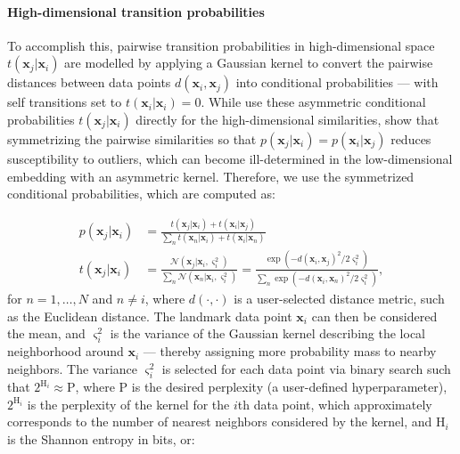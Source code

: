 \documentclass[11pt,a4paper,oneside]{book}
\begin{document}
\begin{appendices}
\paragraph{High-dimensional transition probabilities} To accomplish this, pairwise transition probabilities in high-dimensional space $t(\mathbf{x}_j | \mathbf{x}_i)$ are modelled by applying a Gaussian kernel to convert the pairwise distances between data points $d(\mathbf{x}_i, \mathbf{x}_j)$ into conditional probabilities --- with self transitions set to $t(\mathbf{x}_i | \mathbf{x}_i) = 0$. While \cite{ding2018scvis} use these asymmetric conditional probabilities $t(\mathbf{x}_j | \mathbf{x}_i)$ directly for the high-dimensional similarities, \cite{maaten2008tsne} show that symmetrizing the pairwise similarities so that $p(\mathbf{x}_j | \mathbf{x}_i) = p(\mathbf{x}_i | \mathbf{x}_j)$ reduces susceptibility to outliers, which can become ill-determined in the low-dimensional embedding with an asymmetric kernel. Therefore, we use the symmetrized conditional probabilities, which are computed as:

\begin{subequations}
    \begin{align}
    p(\mathbf{x}_j | \mathbf{x}_i) &= \frac{t(\mathbf{x}_j | \mathbf{x}_i) + t(\mathbf{x}_i | \mathbf{x}_j)}{\sum_{n} t(\mathbf{x}_n | \mathbf{x}_i) + t(\mathbf{x}_i | \mathbf{x}_n)} \label{eq:highd_sim}\\
    t(\mathbf{x}_j | \mathbf{x}_i) &= \frac{\mathcal{N}(\mathbf{x}_j | \mathbf{x}_i, \varsigma_i^{2})}{\sum_{n} \mathcal{N}(\mathbf{x}_n | \mathbf{x}_i, \varsigma_i^{2})} = \frac{\exp \left(-d(\mathbf{x}_i, \mathbf{x}_j)^2 / 2 \varsigma_i^{2}\right)}{\sum_{n} \exp \left(-d(\mathbf{x}_i, \mathbf{x}_n)^2 / 2 \varsigma_i^{2}\right)} \label{eq:transition},
    \end{align}
\end{subequations}
for $n = 1, \dots ,N$ and $n \neq i$, where $d(\cdot, \cdot)$ is a user-selected distance metric, such as the Euclidean distance. The landmark data point $\mathbf{x}_i$ can then be considered the mean, and $\varsigma_i^{2}$ is the variance of the Gaussian kernel describing the local neighborhood around $\mathbf{x}_i$ --- thereby assigning more probability mass to nearby neighbors. 
The variance $\varsigma_i^{2}$ is selected for each data point via binary search such that $2^{\mathrm{H}_i} \approx \mathrm{P}$, where $\mathrm{P}$ is the desired perplexity (a user-defined hyperparameter), $2^{\mathrm{H}_i}$ is the perplexity of the kernel for the $i$th data point, which approximately corresponds to the number of nearest neighbors considered by the kernel, and $\mathrm{H}_i$ is the Shannon entropy in bits, or:


\end{appendices}
\end{document}
